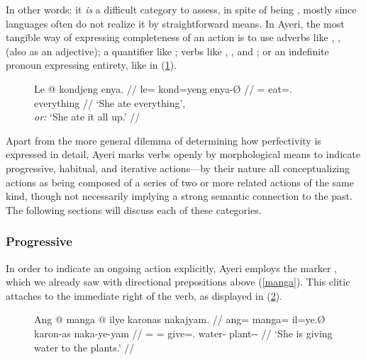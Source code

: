 In other words: it \emph{is} a difficult category to assess, in spite of being
,
mostly since languages often do not realize it by straightforward means. In
Ayeri, the most tangible way of expressing completeness of an action is to
use adverbs like , ,
 (also as an adjective); a quantifier like
; verbs like ,
, and ; or an indefinite
pronoun expressing entirety, like  in
(\ref{ex:entirepfv}).

\begin{figure}[h]
\ex\label{ex:entirepfv}\begingl
	\gla Le @ kondjeng enya. //
	\glb le= kond=yeng enya-Ø //
	\glc \PatTI{}= eat=\TsgF{}.\Aarg{} everything //
	\glft `She ate everything', \\
		\textit{or:} `She ate it all up.' //
\endgl\xe
\end{figure}

Apart from the more general dilemma of determining how perfectivity is
expressed in detail, Ayeri marks verbs openly by morphological means to
indicate progressive, habitual, and iterative actions---by their nature all
conceptualizing actions as being composed of a series of two or more related
actions of the same kind, though not necessarily implying a strong semantic
connection to the past. The following sections will discuss each of these
categories.

\subsubsection{Progressive}

In order to indicate an ongoing action explicitly, Ayeri employs the marker
, which we already saw with directional prepositions above
(\autoref{manga}). This clitic attaches to the immediate right of the verb, as
displayed in (\ref{ex:presprog}).

\begin{figure}[h]
\ex\label{ex:presprog}\begingl
	\gla Ang @ manga @ ilye karonas nakajyam. //
	\glb ang= manga= il=ye.Ø karon-as naka-ye-yam //
	\glc \AgtT{}= \Prog{}= give=\TsgF{}.\Top{} water-\Parg{} 
		plant-\Pl{}-\Dat{} //
	\glft `She is giving water to the plants.' //
\endgl\xe
\end{figure}

